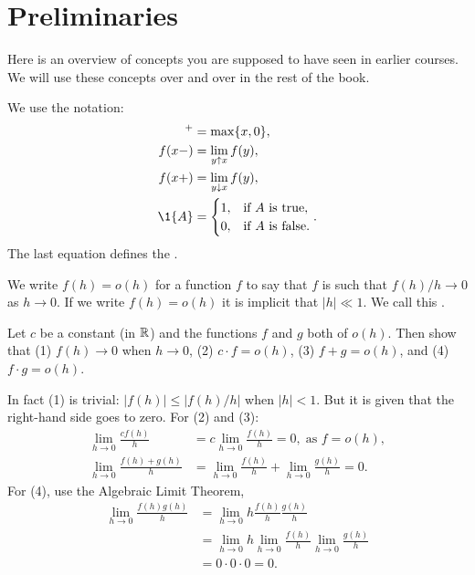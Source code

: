 \documentclass[companion.tex]{subfiles}
\begin{document}
\section{Preliminaries}
\label{sec:preliminaries}


Here is an overview of concepts you are supposed to have seen in earlier courses.
We will use these concepts over and over in the rest of the book.




We use the notation:
 \begin{align*}
 [x]^+ &= \max\{x, 0\}, \\
 f(x-) &= \lim_{y\uparrow x} f(y),\\
 f(x+) &= \lim_{y\downarrow x} f(y),\\
 \1{A} &=
 \begin{cases}
 1, & \text{if $A$ is true}, \\
 0, & \text{if $A$ is false}.
 \end{cases}.
\end{align*}
The last equation defines the .


We write $f(h)=o(h)$ for a function $f$ to say that $f$ is such that $f(h)/h \to 0$ as $h\to 0$.
If we write $f(h) = o(h)$ it is implicit that $|h| \ll 1$.
We call this .
\begin{exercise}
 Let $c$ be a constant (in $\mathbb{R}$) and the functions $f$ and $g$ both of $o(h)$. Then show that (1) $f(h) \to 0$ when $h\to 0$, (2) $c\cdot f = o(h)$, (3) $f+g=o(h)$, and (4) $f\cdot g=o(h)$. 
\begin{solution}
 In fact (1) is trivial: $|f(h)| \leq |f(h)/h|$ when $|h| < 1$.
 But it is given that the right-hand side goes to zero.
 For (2) and (3):
\begin{align*}
\lim_{h\to 0} \frac{c f(h)}{h} &= c \lim_{h\to 0} \frac{f(h)}{h} = 0, \; \text{as } f = o(h), \\
\lim_{h\to 0} \frac{f(h) + g(h)} h &= \lim_{h\to 0} \frac{f(h)} h + \lim_{h\to 0} \frac{g(h)} h = 0.
\end{align*}
For (4), use the Algebraic Limit Theorem,
\begin{align*}
\lim_{h\to 0} \frac{f(h)g(h)}{h} &= \lim_{h\to 0} h \frac{f(h)}{h} \frac{g(h)}{h} \\
&= \lim_{h\to 0} h \lim_{h\to 0} \frac{f(h)}{h} \lim_{h\to 0} \frac{g(h)}{h} \\
&= 0 \cdot 0 \cdot 0 = 0.
\end{align*}
\end{solution}
\end{exercise}
\end{document}
